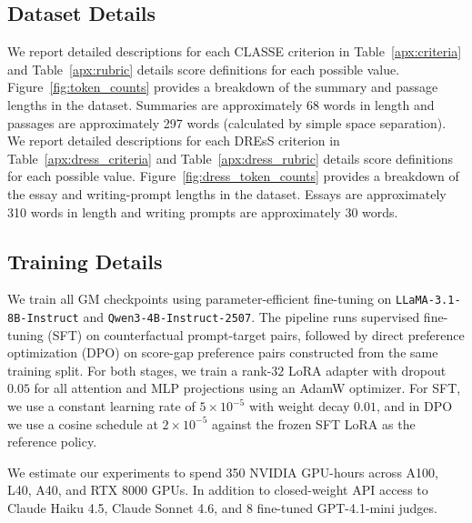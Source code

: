 \documentclass[letterpaper]{article} %
\begin{document}
\subsection{Dataset Details} \label{apx:classe}

We report detailed descriptions for each CLASSE criterion in Table~\ref{apx:criteria} and Table~\ref{apx:rubric} details score definitions for each possible value. Figure~\ref{fig:token_counts} provides a breakdown of the summary and passage lengths in the dataset. Summaries are approximately 68 words in length and passages are approximately 297 words (calculated by simple space separation). We report detailed descriptions for each DREsS criterion in Table~\ref{apx:dress_criteria} and Table~\ref{apx:dress_rubric} details score definitions for each possible value. Figure~\ref{fig:dress_token_counts} provides a breakdown of the essay and writing-prompt lengths in the dataset. Essays are approximately 310 words in length and writing prompts are approximately 30 words.

\subsection{Training Details} \label{apx:training}

We train all GM checkpoints using parameter-efficient fine-tuning on \texttt{LLaMA-3.1-8B-Instruct} and \texttt{Qwen3-4B-Instruct-2507}. The pipeline runs supervised fine-tuning (SFT) on counterfactual prompt-target pairs, followed by direct preference optimization (DPO) on score-gap preference pairs constructed from the same training split. For both stages, we train a rank-$32$ LoRA adapter with dropout $0.05$ for all attention and MLP projections using an AdamW optimizer. For SFT, we use a constant learning rate of $5\!\times\!10^{-5}$ with weight decay $0.01$, and in DPO we use a cosine schedule at $2\!\times\!10^{-5}$ against the frozen SFT LoRA as the reference policy.

We estimate our experiments to spend 350 NVIDIA GPU-hours across A100, L40, A40, and RTX 8000 GPUs. In addition to closed-weight API access to Claude Haiku 4.5, Claude Sonnet 4.6, and 8 fine-tuned GPT-4.1-mini judges.

\end{document}
